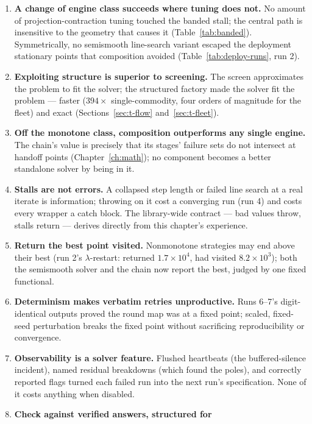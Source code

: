 \begin{enumerate}
\item \textbf{A change of engine class succeeds where tuning does not.}
  No amount of projection-contraction tuning touched the banded stall; the
  central path is insensitive to the geometry that causes it
  (Table~\ref{tab:banded}). Symmetrically, no semismooth line-search
  variant escaped the deployment stationary points that composition
  avoided (Table~\ref{tab:deploy-runs}, run 2).
\item \textbf{Exploiting structure is superior to screening.} The screen
  approximates the problem to fit the solver; the structured factory made
  the solver fit the problem --- faster ($394\times$ single-commodity,
  four orders of magnitude for the fleet) and exact
  (Sections~\ref{sec:t-flow} and~\ref{sec:t-fleet}).
\item \textbf{Off the monotone class, composition outperforms any single
  engine.} The chain's value is precisely that its stages' failure sets do
  not intersect at handoff points (Chapter~\ref{ch:math}); no component
  becomes a better standalone solver by being in it.
\item \textbf{Stalls are not errors.} A collapsed step length or failed
  line search at a real iterate is information; throwing on it cost a
  converging run (run 4) and costs every wrapper a catch block. The
  library-wide contract --- bad values throw, stalls return --- derives
  directly from this chapter's experience.
\item \textbf{Return the best point visited.} Nonmonotone strategies may
  end above their best (run 2's $\lambda$-restart: returned
  $1.7\times 10^{4}$, had visited $8.2\times 10^{3}$); both the semismooth
  solver and the chain now report the best, judged by one fixed
  functional.
\item \textbf{Determinism makes verbatim retries unproductive.} Runs
  6--7's digit-identical outputs proved the round map was at a fixed
  point; scaled, fixed-seed perturbation breaks the fixed point without
  sacrificing reproducibility or convergence.
\item \textbf{Observability is a solver feature.} Flushed heartbeats (the
  buffered-silence incident), named residual breakdowns (which found the
  poles), and correctly reported  flags turned each failed
  run into the next run's specification. None of it costs anything when
  disabled.
\item \textbf{Check against verified answers, structured for
}
\end{enumerate}
